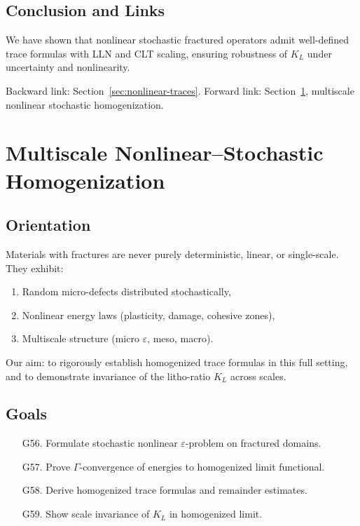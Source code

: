 \subsection*{Conclusion and Links}

We have shown that nonlinear stochastic fractured operators admit well-defined trace formulas with LLN and CLT scaling, ensuring robustness of $K_L$ under uncertainty and nonlinearity.  

Backward link: Section~\ref{sec:nonlinear-traces}.  
Forward link: Section~\ref{sec:multiscale-couplings}, multiscale nonlinear stochastic homogenization.  

\section{Multiscale Nonlinear–Stochastic Homogenization}
\label{sec:multiscale-couplings}

\subsection*{Orientation}

Materials with fractures are never purely deterministic, linear, or single-scale.  
They exhibit:
\begin{enumerate}
  \item Random micro-defects distributed stochastically,
  \item Nonlinear energy laws (plasticity, damage, cohesive zones),
  \item Multiscale structure (micro $\varepsilon$, meso, macro).
\end{enumerate}

Our aim: to rigorously establish homogenized trace formulas in this full setting, and to demonstrate invariance of the litho-ratio $K_L$ across scales.

\subsection*{Goals}

\begin{itemize}
  \item[G56.] Formulate stochastic nonlinear $\varepsilon$-problem on fractured domains.  
  \item[G57.] Prove $\Gamma$-convergence of energies to homogenized limit functional.  
  \item[G58.] Derive homogenized trace formulas and remainder estimates.  
  \item[G59.] Show scale invariance of $K_L$ in homogenized limit.  
\end{itemize}

